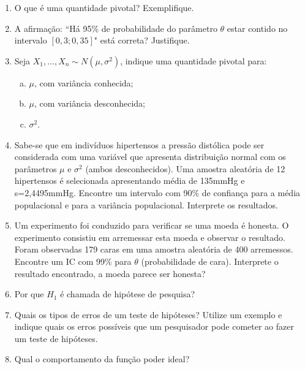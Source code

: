 \documentclass[10pt,brazil,addpoints]{exam}
\begin{document}
\begin{enumerate}[1.]

\item O que é uma quantidade pivotal? Exemplifique.

\item A afirmação: ``Há 95\% de probabilidade do parâmetro $\theta$ estar contido no intervalo $[0,3 ; 0,35]$" está correta? Justifique.

\item Seja $X_1, \ldots, X_n \sim N(\mu, \sigma^2)$, indique uma quantidade pivotal para:

\begin{enumerate}[a)] 

\item $\mu$, com variância conhecida;

\item $\mu$, com variância desconhecida;

\item $\sigma^2$.

\end{enumerate}

\item Sabe-se que em indivíduos hipertensos a pressão distólica pode ser considerada com uma variável que apresenta distribuição normal com os parâmetros $\mu$ e $\sigma^2$ (ambos   desconhecidos). Uma amostra aleatória de 12 hipertensos é selecionada apresentando média de 135mmHg e s=2,4495mmHg. Encontre um intervalo com 90\% de confiança para a média populacional e para a variância populacional. Interprete os resultados.

\item Um experimento foi conduzido para verificar se uma moeda é honesta. O experimento consistiu em arremessar esta moeda e observar o resultado. Foram observadas 179 caras em uma amostra aleatória de 400 arremessos. Encontre um IC com 99\% para $\theta$ (probabilidade de cara). Interprete o resultado encontrado,  a moeda parece ser honesta?

\item Por que $H_1$ é chamada de hipótese de pesquisa?

\item Quais os tipos de erros de um teste de hipóteses? Utilize um exemplo e indique quais os erros possíveis que um pesquisador pode cometer ao fazer um teste de hipóteses.

\item Qual o comportamento da função poder ideal?


\end{enumerate}
\end{document}
